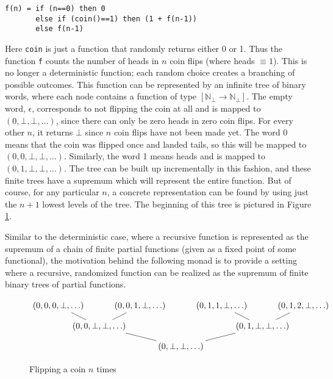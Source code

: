 \begin{verbatim}
f(n) = if (n==0) then 0 
       else if (coin()==1) then (1 + f(n-1))
       else f(n-1)
\end{verbatim}
Here \texttt{coin} is just a function that randomly returns either 0 or 1.  Thus the function \texttt{f} counts the number of heads in $n$ coin flips (where heads $\equiv 1$).  This is no longer a deterministic function; each random choice creates a branching of possible outcomes.  This function can be represented by an infinite tree of binary words, where each node contains a function of type $[\mathbb{N}_\bot \rightarrow \mathbb{N}_\bot]$.  The empty word, $\epsilon$, corresponds to not flipping the coin at all and is mapped to $(0,\bot,\bot,\ldots)$, since there can only be zero heads in zero coin flips.  For every other $n$, it returns $\bot$ since $n$ coin flips have not been made yet.  The word 0 means that the coin was flipped once and landed tails, so this will be mapped to $(0,0,\bot,\bot,\ldots)$.  Similarly, the word 1 means heads and is mapped to $(0,1,\bot,\bot,\ldots)$.  The tree can be built up incrementally in this fashion, and these finite trees have a supremum which will represent the entire function.  But of course, for any particular $n$, a concrete representation can be found by using just the $n+1$ lowest levels of the tree.  The beginning of this tree is pictured in Figure \ref{fig:cointree}. 

Similar to the deterministic case, where a recursive function is represented as the supremum of a chain of finite partial functions (given as a fixed point of some functional), the motivation behind the following monad is to provide a setting where a recursive, randomized function can be realized as the supremum of finite binary trees of partial functions.

\begin{figure} \label{fig:cointree}
\[
\xymatrix@!0@C=4pc{
(0,0,0,\bot,\ldots) & & (0,0,1,\bot,\ldots) & & (0,1,1,\bot,\ldots) & & (0,1,2,\bot,\ldots) \\
& (0,0,\bot,\bot,\ldots)\ar@{-}[ul]\ar@{-}[ur] & & & & (0,1,\bot,\bot,\ldots)\ar@{-}[ul]\ar@{-}[ur] \\
& & & (0,\bot,\bot,\ldots)\ar@{-}[ull]\ar@{-}[urr] \\
}
\]
\caption{Flipping a coin $n$ times}
\end{figure}
